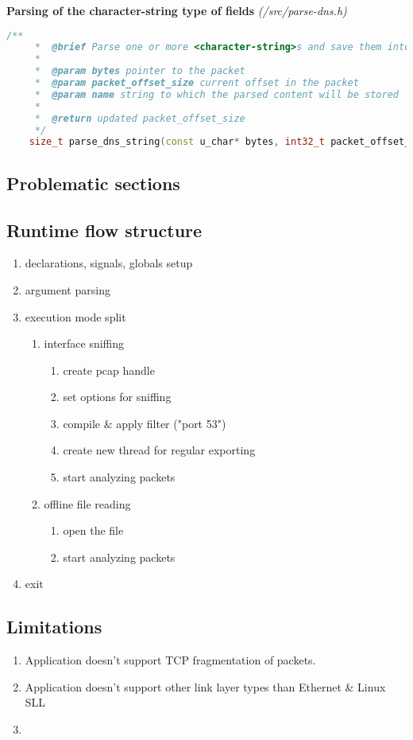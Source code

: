 \vspace{1cm}
\textbf{Parsing of the character-string type of fields} \textit{(/src/parse-dns.h)}
\begin{lstlisting}[language=C++]
    /**
     *  @brief Parse one or more <character-string>s and save them into a string
     * 
     *  @param bytes pointer to the packet
     *  @param packet_offset_size current offset in the packet
     *  @param name string to which the parsed content will be stored
     * 
     *  @return updated packet_offset_size
     */
    size_t parse_dns_string(const u_char* bytes, int32_t packet_offset_size, std::string &name);
\end{lstlisting}

\subsection{Problematic sections}

\subsection{Runtime flow structure}

\begin{enumerate}
\item declarations, signals, globals setup
\item argument parsing
\item execution mode split
\begin{enumerate}[label=(\alph*)]
\item interface sniffing
\begin{enumerate}
\item create pcap handle
\item set options for sniffing
\item compile \& apply filter ("port 53")
\item create new thread for regular exporting
\item start analyzing packets
\end{enumerate}
\item offline file reading
\begin{enumerate}
\item open the file
\item start analyzing packets
\end{enumerate}
\end{enumerate}
\item exit
\end{enumerate}

\subsection{Limitations}

\begin{enumerate}
\item Application doesn't support TCP fragmentation of packets.
\item Application doesn't support other link layer types than Ethernet \& Linux SLL
\item 
\end{enumerate}